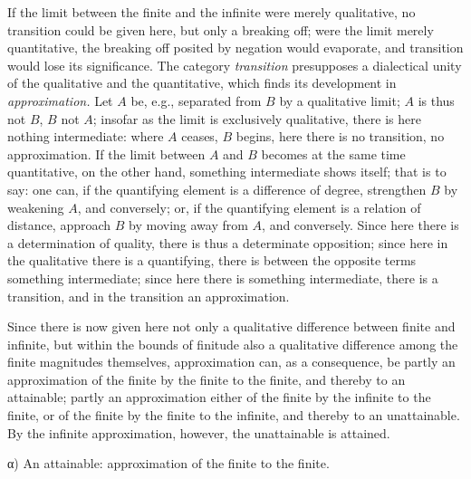 \documentclass[12pt,a4paper,openany]{book}
\begin{document}
If the limit between the finite and the infinite were merely qualitative, no transition could be given here, but only a breaking off; were the limit merely quantitative, the breaking off posited by negation would evaporate, and transition would lose its significance. The category \emph{transition} presupposes a dialectical unity of the qualitative and the quantitative, which finds its development in \emph{approximation.} Let $A$ be, e.g., separated from $B$ by a qualitative limit; $A$ is thus not $B$, $B$ not $A$; insofar as the limit is exclusively qualitative, there is here nothing intermediate: where $A$ ceases, $B$ begins, here there is no transition, no approximation. If the limit between $A$ and $B$ becomes at the same time quantitative, on the other hand, something intermediate shows itself; that is to say: one can, if the quantifying element is a difference of degree, strengthen $B$ by weakening $A$, and conversely; or, if the quantifying element is a relation of distance, approach $B$ by moving away from $A$, and conversely. Since here there is a determination of quality, there is thus a determinate opposition; since here in the qualitative there is a quantifying, there is between the opposite terms something intermediate; since here there is something intermediate, there is a transition, and in the transition an approximation.

Since there is now given here not only a qualitative difference between finite and infinite, but within the bounds of finitude also a qualitative difference among the finite magnitudes themselves, approximation can, as a consequence, be partly an approximation of the finite by the finite to the finite, and thereby to an attainable; partly an approximation either of the finite by the infinite to the finite, or of the finite by the finite to the infinite, and thereby to an unattainable. By the infinite approximation, however, the unattainable is attained.

\begin{center}α) An attainable: approximation of the finite to the finite.\end{center}
\end{document}
